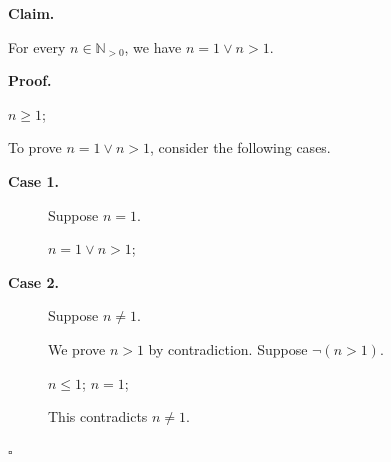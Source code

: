 \documentclass[11pt]{article}
\begin{document}
\par\medskip\noindent\textbf{Claim.}\par\nopagebreak[4]
\par\noindent For every $n\in \mathbb{N}_{>0}$, we have $n = 1 \lor n > 1$.\par
\par\medskip\noindent\textbf{Proof.}\par\nopagebreak[4]
$n \geq 1$;
\par\noindent To prove $n = 1 \lor n > 1$, consider the following cases.\par
\begin{description}
\item[\textbf{Case 1.}] Suppose $n = 1$.\par
$n = 1 \lor n > 1$;
\item[\textbf{Case 2.}] Suppose $n \ne 1$.\par
\par\noindent We prove $n > 1$ by contradiction. Suppose $\neg\left(n > 1\right)$.\par
$n \leq 1$;
$n = 1$;
\par\noindent This contradicts $n \ne 1$.\par
\end{description}
\par\nobreak\hfill$\square$\par
\end{document}
